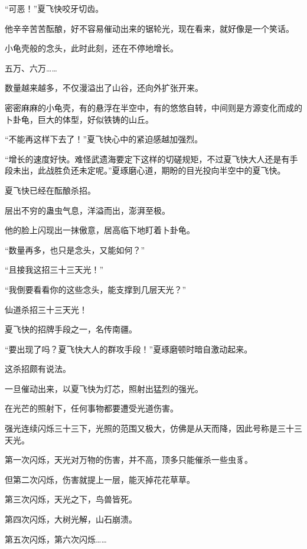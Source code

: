 
\begin{this_body}



“可恶！”夏飞快咬牙切齿。

他辛辛苦苦酝酿，好不容易催动出来的锯轮光，现在看来，就好像是一个笑话。

小龟壳般的念头，此时此刻，还在不停地增长。

五万、六万……

数量越来越多，不仅漫溢出了山谷，还向外扩张开来。

密密麻麻的小龟壳，有的悬浮在半空中，有的悠悠自转，中间则是方源变化而成的卜卦龟，巨大的体型，好似铁铸的山丘。

“不能再这样下去了！”夏飞快心中的紧迫感越加强烈。

“增长的速度好快。难怪武遗海要定下这样的切磋规矩，不过夏飞快大人还是有手段未出，此战胜负还未定呢。”夏琢磨心道，期盼的目光投向半空中的夏飞快。

夏飞快已经在酝酿杀招。

层出不穷的蛊虫气息，洋溢而出，澎湃至极。

他的脸上闪现出一抹傲意，居高临下地盯着卜卦龟。

“数量再多，也只是念头，又能如何？”

“且接我这招三十三天光！”

“我倒要看看你的这些念头，能支撑到几层天光？”

仙道杀招三十三天光！

夏飞快的招牌手段之一，名传南疆。

“要出现了吗？夏飞快大人的群攻手段！”夏琢磨顿时暗自激动起来。

这杀招颇有说法。

一旦催动出来，以夏飞快为灯芯，照射出猛烈的强光。

在光芒的照射下，任何事物都要遭受光道伤害。

强光连续闪烁三十三下，光照的范围又极大，仿佛是从天而降，因此号称是三十三天光。

第一次闪烁，天光对万物的伤害，并不高，顶多只能催杀一些虫豸。

但第二次闪烁，伤害就提上一层，能灭掉花花草草。

第三次闪烁，天光之下，鸟兽皆死。

第四次闪烁，大树光解，山石崩溃。

第五次闪烁，第六次闪烁……


\end{this_body}
